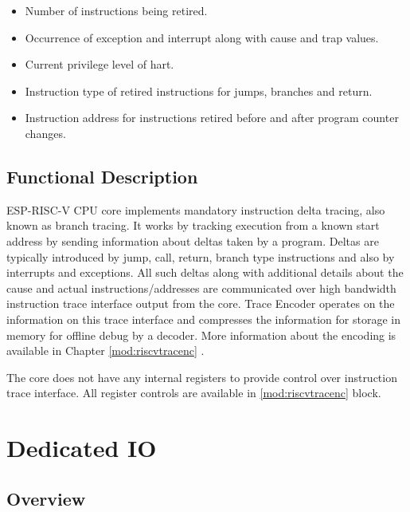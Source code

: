 \documentclass[main\_\_EN.tex]{subfiles}
\begin{document}
\begin{itemize}
    \item Number of instructions being retired.
    \item Occurrence of exception and interrupt along with cause and trap values.
    \item Current privilege level of hart.
    \item Instruction type of retired instructions for jumps, branches and return.
    \item Instruction address for instructions retired before and after program counter changes.
\end{itemize}


\subsection{Functional Description}
\label{sec:riscvcpu-trace-func-descr}

ESP-RISC-V CPU core implements mandatory instruction delta tracing, also known as branch tracing. It works by tracking execution from a known start address by sending information about deltas taken by a program. Deltas are typically introduced by jump, call, return, branch type instructions and also by interrupts and exceptions. All such deltas along with additional details about the cause and actual instructions/addresses are communicated over high bandwidth instruction trace interface output from the core. Trace Encoder operates on the information on this trace interface and compresses the information for storage in memory for offline debug by a decoder. More information about the encoding is available in Chapter \ref{mod:riscvtracenc} \textit{}.

The core does not have any internal registers to provide control over instruction trace interface. All register controls are available in \ref{mod:riscvtracenc} \textit{} block.




\clearpage
\section{Dedicated IO}
\label{sec:riscvcpu-fastio}

\subsection{Overview}
\label{sec:riscvcpu-fastio-overview}
\end{document}
